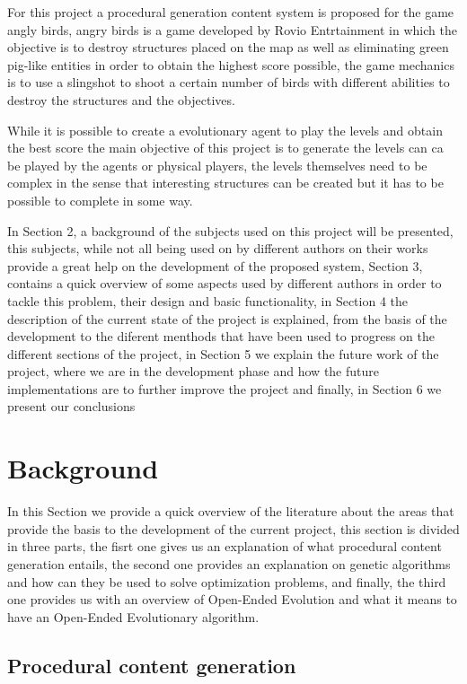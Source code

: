 \documentclass[graybox]{svmult}
\begin{document}
For this project a procedural generation content system is proposed for the game angly birds, angry birds is a game developed by Rovio Entrtainment in which the objective is to destroy structures placed on the map as well as eliminating green pig-like entities in order to obtain the highest score possible, the game mechanics is to use a slingshot to shoot a certain number of birds with different abilities to destroy the structures and the objectives. \cite{RovioEntertainmentCorporation2009}

 
While it is possible to create a evolutionary agent to play the levels and obtain the best score the main objective of this project is to generate the levels can ca be played by the agents or physical players, the levels themselves need to be complex in the sense that interesting structures can be created but it has to be possible to complete in some way.
 
In Section 2, a background of the subjects used on this project will be presented, this subjects, while not all being used on by different authors on their works provide a great help on the development of the proposed system, Section 3, contains a quick overview of some aspects used by different authors in order to tackle this problem, their design and basic functionality, in Section 4 the description of the current state of the project is explained, from the basis of the development to the diferent menthods that have been used to progress on the different sections of the project, in Section 5 we explain the future work of the project, where we are in the development phase and how the future implementations are to further improve the project and finally, in Section 6 we present our conclusions
 
\section{Background}
\label{sec:3}
In this Section we provide a quick overview of the literature about the areas that provide the basis to the development of the current project, this section is divided in three parts, the fisrt one gives us an explanation of what procedural content generation entails, the second one provides an explanation on genetic algorithms and how can they be used to solve optimization problems, and finally, the third one provides us with an overview of Open-Ended Evolution and what it means to have an Open-Ended Evolutionary algorithm.

\subsection{Procedural content generation}
\end{document}
